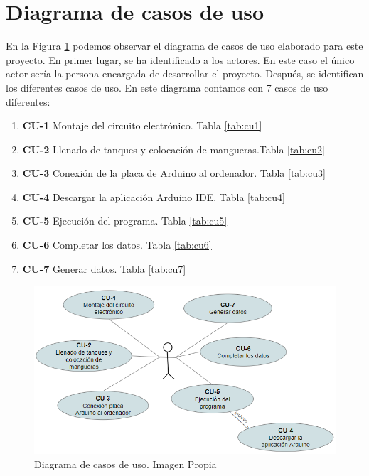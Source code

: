 

\section{Diagrama de casos de uso}

En la Figura \ref{fig:cu} podemos observar el diagrama de casos de uso elaborado para este proyecto. En primer lugar, se ha identificado a los actores. En este caso el único actor sería la persona encargada de desarrollar el proyecto. Después, se identifican los diferentes casos de uso. En este diagrama contamos con 7 casos de uso diferentes:

\begin{enumerate}
    \item \textbf{CU-1} Montaje del circuito electrónico. Tabla \ref{tab:cu1}
    \item \textbf{CU-2} Llenado de tanques y colocación de mangueras.Tabla \ref{tab:cu2}
    \item \textbf{CU-3} Conexión de la placa de Arduino al ordenador. Tabla \ref{tab:cu3}
    \item \textbf{CU-4} Descargar la aplicación Arduino IDE. Tabla \ref{tab:cu4}
    \item \textbf{CU-5} Ejecución del programa. Tabla \ref{tab:cu5}
    \item \textbf{CU-6} Completar los datos. Tabla \ref{tab:cu6}
    \item \textbf{CU-7} Generar datos. Tabla \ref{tab:cu7}
\end{enumerate}
\begin{figure}[h]
    \centering
    \includegraphics[width=1.2\textwidth]{img/CU.PNG}
    \caption{Diagrama de casos de uso. Imagen Propia}
    \label{fig:cu}
\end{figure}



